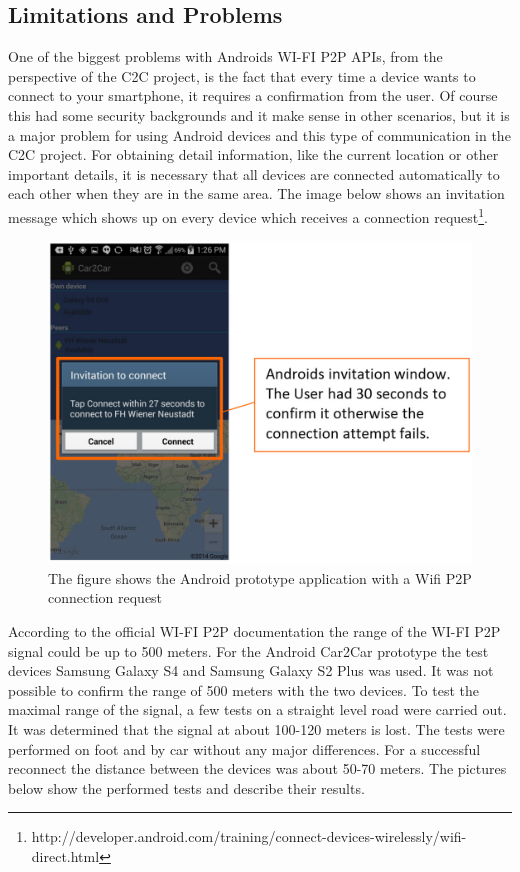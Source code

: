 \subsection*{Limitations and Problems}
\label{subsec:AndroidLimitationsProblems}
One of the biggest problems with Androids WI-FI P2P APIs, from the perspective of the C2C project, is the fact that every time a device wants to connect to your smartphone, it requires a confirmation from the user. Of course this had some security backgrounds and it make sense in other scenarios, but it is a major problem for using Android devices and this type of communication in the C2C project.  For obtaining detail information, like the current location or other important details, it is necessary that all devices are connected automatically to each other when they are in the same area. The image below shows an invitation message which shows up on every device which receives a connection request\footnote{\label{foot:2}http://developer.android.com/training/connect-devices-wirelessly/wifi-direct.html}.\newline
 
\begin{figure}[H]
	\centering
  \includegraphics[width=\linewidth,]{images/androidScreen3.eps}
	\caption{The figure shows the Android prototype application with a Wifi P2P connection request}
	\label{fig1}
\end{figure}

\noindent According to the official WI-FI P2P documentation the range of the WI-FI P2P signal could be up to 500 meters. For the Android Car2Car prototype the test devices Samsung Galaxy S4 and Samsung Galaxy S2 Plus was used. It was not possible to confirm the range of 500 meters with the two devices. To test the maximal range of the signal, a few tests on a straight level road were carried out. It was determined that the signal at about 100-120 meters is lost. The tests were performed on foot and by car without any major differences. For a successful reconnect the distance between the devices was about 50-70 meters. The pictures below show the performed tests and describe their results.

